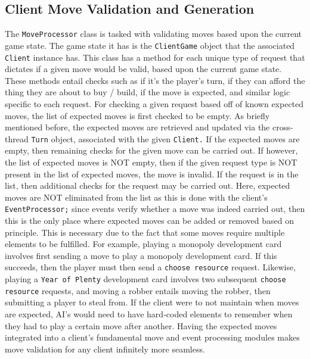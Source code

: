 \documentclass[a4paper,doc]{apa6}
\newcommand{\code}{\texttt}
\begin{document}
\subsection{Client Move Validation and Generation}
The \code{MoveProcessor} class is tasked with validating moves based upon the current game state. The game state it has is the \code{ClientGame} object that the associated \code{Client} instance has. This class has a method for each unique type of request that dictates if a given move would be valid, based upon the current game state. These methods entail checks such as if it’s the player’s turn, if they can afford the thing they are about to buy / build, if the move is expected, and similar logic specific to each request. For checking a given request based off of known expected moves, the list of expected moves is first checked to be empty. As briefly mentioned before, the expected moves are retrieved and updated via the cross-thread \code{Turn} object, associated with the given \code{Client.} If the expected moves are empty, then remaining checks for the given move can be carried out. If however, the list of expected moves is NOT empty, then if the given request type is NOT present in the list of expected moves, the move is invalid. If the request is in the list, then additional checks for the request may be carried out. Here, expected moves are NOT eliminated from the list as this is done with the client’s \code{EventProcessor;} since events verify whether a move was indeed carried out, then this is the only place where expected moves can be added or removed based on principle. This is necessary due to the fact that some moves require multiple elements to be fulfilled. For example, playing a monopoly development card involves first sending a move to play a monopoly development card. If this succeeds, then the player must then send a \code{choose resource} request. Likewise, playing a \code{Year of Plenty} development card involves two subsequent \code{choose resource} requests, and moving a robber entails moving the robber, then submitting a player to steal from. If the client were to not maintain when moves are expected, AI’s would need to have hard-coded elements to remember when they had to play a certain move after another. Having the expected moves integrated into a client’s fundamental move and event processing modules makes move validation for any client infinitely more seamless.
\end{document}
